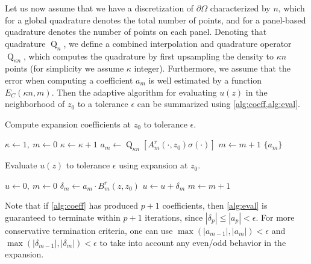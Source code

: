 \documentclass[hidelinks]{siamart1116}
\begin{document}
Let us now assume that we have a discretization of ${{\partial\Omega}}$
characterized by $n$, which for a global quadrature denotes the total
number of points, and for a panel-based quadrature denotes the number
of points on each panel. Denoting that quadrature ${{\operatorname{Q}}_{n}}$, we define
a combined interpolation and quadrature operator
${\operatorname{Q}}_{{\kappa} n}$, which computes the quadrature by first
upsampling the density to ${\kappa} n$ points (for simplicity we assume
${\kappa}$ integer). Furthermore, we assume that the error when
computing a coefficient $a_m$ is well estimated by a function
${E_C}({\kappa} n, m)$. Then the adaptive algorithm for evaluating
$u(z)$ in the neighborhood of $z_0$ to a tolerance $\epsilon$ can be
summarized using \cref{alg:coeff,alg:eval}.
\begin{algorithm}[H]
  \caption{Compute expansion coefficients at $z_0$ to tolerance ${\epsilon}$.}
  \label{alg:coeff}
  \begin{algorithmic}
    \State ${\kappa} \gets 1, \: m \gets 0$
    \Repeat
    \State ${\kappa} \gets {\kappa}+1$
    \EndWhile
    \State $a_m \gets {\operatorname{Q}}_{\kappa n}[{A}_m^r(\cdot, z_0) {\sigma}(\cdot)]$
    \State $m \gets m+1$
    \State \Return $\{a_m\}$
    \EndFunction
  \end{algorithmic}
\end{algorithm}
\begin{algorithm}[H]
  \caption{Evaluate $u(z)$ to tolerance ${\epsilon}$ using expansion at $z_0$.}
  \label{alg:eval}
  \begin{algorithmic}
    \State $u \gets 0, \: m \gets 0$
    \Repeat
    \State $\delta_m \gets {a}_m \cdot {B}_m^r(z, z_0)$
    \State $u \gets u + \delta_m$
    \State $m \gets m+1$
    \State {}
    \EndFunction
  \end{algorithmic}
\end{algorithm}
Note that if \cref{alg:coeff} has produced $p+1$
coefficients, then \cref{alg:eval} is guaranteed to terminate
within $p+1$ iterations, since $|\delta_p| \le |a_p| < {\epsilon}$. For more
conservative termination criteria, one can use
$\max(|a_{m-1}|,|a_m|) < {\epsilon}$ and
$\max(|\delta_{m-1}|,|\delta_m|) < {\epsilon}$ to take into account any
even/odd behavior in the expansion. 
\end{document}
